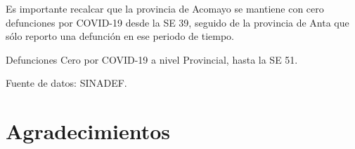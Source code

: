 \documentclass[12pt,a4paper,openany]{book}
\begin{document}
	Es importante recalcar que la provincia de Acomayo se mantiene con cero defunciones por COVID-19 desde la SE 39, seguido de la provincia de Anta que sólo reporto una defunción en ese periodo de tiempo. 
	\begin{table}[h]
		\caption{Defunciones Cero por COVID-19 a nivel Provincial, hasta la SE 51.}
		\resizebox{\textwidth}{!}{%
			
		}
		{\footnotesize {Fuente de datos: SINADEF.}}
	\end{table}
\pagebreak

	\section*{Agradecimientos}
		
\end{document}
